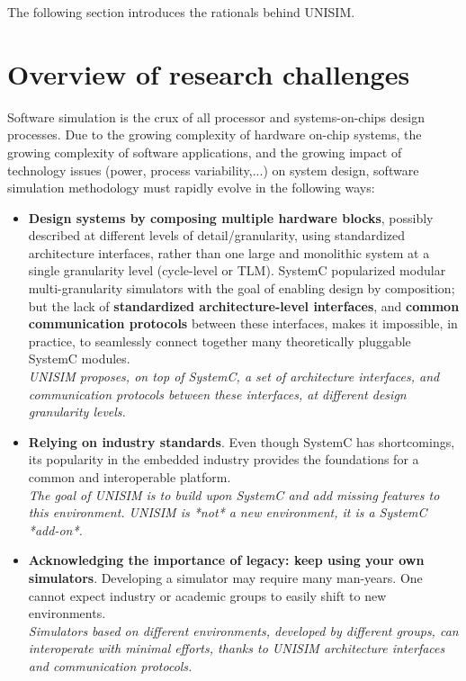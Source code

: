 The following section introduces the rationals behind UNISIM.

\section{Overview of research challenges}

Software simulation is the crux of all processor and systems-on-chips design processes. Due to the growing complexity of hardware on-chip systems, the growing complexity of software applications, and the growing impact of technology issues (power, process variability,...) on system design, software simulation methodology must rapidly evolve in the following ways:

\begin{itemize}
\item \textbf{Design systems by composing multiple hardware blocks}, possibly described at different levels of detail/granularity, using standardized architecture interfaces, rather than one large and monolithic system at a single granularity level (cycle-level or TLM). SystemC popularized modular multi-granularity simulators with the goal of enabling design by composition; but the lack of \textbf{standardized architecture-level interfaces}, and \textbf{common communication protocols} between these interfaces, makes it impossible, in practice, to seamlessly connect together many theoretically pluggable SystemC modules.\\
\emph{UNISIM proposes, on top of SystemC, a set of architecture interfaces, and communication protocols between these interfaces, at different design granularity levels.}
\item \textbf{Relying on industry standards}. Even though SystemC has shortcomings, its popularity in the embedded industry provides the foundations for a common and interoperable platform.\\
\emph{The goal of UNISIM is to build upon SystemC and add missing features to this environment. UNISIM is *not* a new environment, it is a SystemC *add-on*.}
\item \textbf{Acknowledging the importance of legacy: keep using your own simulators}. Developing a simulator may require many man-years. One cannot expect industry or academic groups to easily shift to new environments.\\
\emph{Simulators based on different environments, developed by different groups, can interoperate with minimal efforts, thanks to UNISIM architecture interfaces and communication protocols.}\\

\end{itemize}

